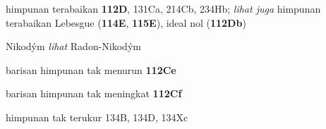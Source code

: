 \indexmedskip



































himpunan terabaikan {\bf 112D}, 131Ca,
  214Cb, 234Hb; 
  {\it lihat juga} 
himpunan terabaikan Lebesgue ({\bf 114E}, {\bf 115E}), ideal nol ({\bf 112Db})




























Nikod\'ym {\it lihat} Radon-Nikod\'ym








barisan himpunan tak menurun {\bf 112Ce}

barisan himpunan tak meningkat {\bf 112Cf}

himpunan tak terukur 134B, 134D, 134Xc














